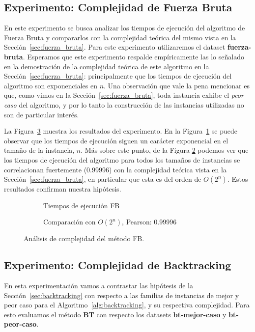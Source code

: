 \documentclass{article}
\newcommand{\fb}{Fuerza Bruta}
\newcommand{\dfb}{\textbf{fuerza-bruta}}
\begin{document}
\subsection{Experimento: Complejidad de Fuerza Bruta}
En este experimento se busca analizar los tiempos de ejecución del algoritmo de \fb{} y compararlos con la complejidad teórica del mismo vista en la Sección~\ref{sec:fuerza_bruta}. Para este experimento utilizaremos el dataset \dfb{}. Esperamos que este experimento respalde empíricamente las lo señalado en la demostración de la complejidad teórica de este algoritmo en la Sección~\ref{sec:fuerza_bruta}: principalmente que los tiempos de ejecución del algoritmo son exponenciales en $n$. Una observación que vale la pena mencionar es que, como vimos en la Sección~\ref{sec:fuerza_bruta}, toda instancia exhibe el \emph{peor caso} del algoritmo, y por lo tanto la construcción de las instancias utilizadas no son de particular interés.

La Figura~\ref{fig:fb-complejidad} muestra los resultados del experimento. En la Figura~\ref{fig:fb-complejidad-a} se puede observar que los tiempos de ejecución siguen un carácter exponencial en el tamaño de la instancia, $n$. Más sobre este punto, de la Figura \ref{fig:fb-complejidad-b} podemos ver que los tiempos de ejecución del algoritmo para todos los tamaños de instancias se correlacionan fuertemente (0.99996) con la complejidad teórica vista en la Sección~\ref{sec:fuerza_bruta}, en particular que esta es del orden de $O(2^{n})$. Estos resultados confirman nuestra hipótesis.

\begin{figure}[!ht]
    \centering
    \begin{subfigure}[b]{0.45\textwidth}
        \centering
        
        \caption{Tiempos de ejecución FB}
        \label{fig:fb-complejidad-a}
    \end{subfigure}
    \begin{subfigure}[b]{0.45\textwidth}
        \centering
        
        \caption{Comparación con $O(2^{n})$, Pearson: 0.99996}
        \label{fig:fb-complejidad-b}
    \end{subfigure}
    \caption{Análisis de complejidad del método FB.}
    \label{fig:fb-complejidad}
\end{figure}

\subsection{Experimento: Complejidad de Backtracking}
En esta experimentación vamos a contrastar las hipótesis de la Sección~\ref{sec:backtracking} con respecto a las familias de instancias de mejor y peor caso para el Algoritmo~\ref{alg:backtracking}, y su respectiva complejidad. Para esto evaluamos el método \textbf{BT} con respecto los datasets \textbf{bt-mejor-caso} y \textbf{bt-peor-caso}.
\end{document}
